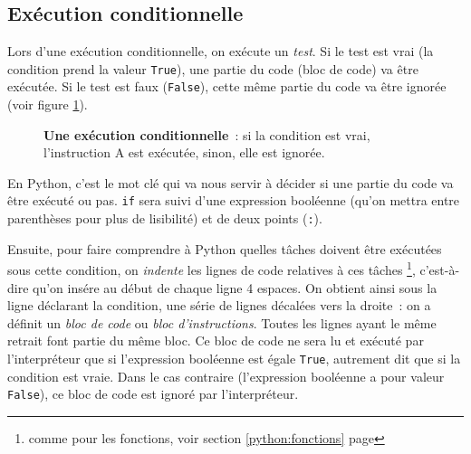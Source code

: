 
\subsection{Exécution conditionnelle}\label{python:conditions:if}

Lors d'une exécution conditionnelle, on exécute un \textit{test}. Si le test est vrai
 (la condition prend la valeur \texttt{True}), une partie du code (bloc de code) va être exécutée.
 Si le test est faux (\texttt{False}), cette même partie du code va être ignorée
 (voir figure \ref{python:conditions:figures:if}).

 \begin{figure}[h]
	\caption{\textbf{Une exécution conditionnelle}~: si la condition est vrai, l'instruction A
est exécutée, sinon, elle est ignorée.}\label{python:conditions:figures:if}
\centering
{}
\end{figure}

En Python, c'est le mot clé  qui va nous servir à décider si une partie du code va être
exécuté ou pas. \texttt{if} sera suivi d'une expression booléenne (qu'on mettra entre parenthèses
pour plus de lisibilité) et de deux points (\texttt{:}).

Ensuite, pour faire comprendre à Python quelles tâches doivent être exécutées sous cette condition,
 on \textit{indente} les lignes de code relatives à ces tâches
 \footnote{comme pour les fonctions, voir section \ref{python:fonctions} page \pageref{python:fonctions}},
 c'est-à-dire qu'on insére au début de chaque ligne 4 espaces.
On obtient ainsi sous la ligne déclarant la condition, une série de lignes décalées vers la droite~:
 on a définit un \textit{bloc de code} ou \textit{bloc d'instructions}. Toutes les lignes ayant
 le même  retrait font partie du même bloc. Ce bloc de code ne sera lu et exécuté par l'interpréteur
  que si l'expression booléenne est égale \texttt{True}, autrement dit que si la condition est vraie.
   Dans le cas contraire (l'expression booléenne a pour valeur \texttt{False}), ce bloc de code est
   ignoré par l'interpréteur.

